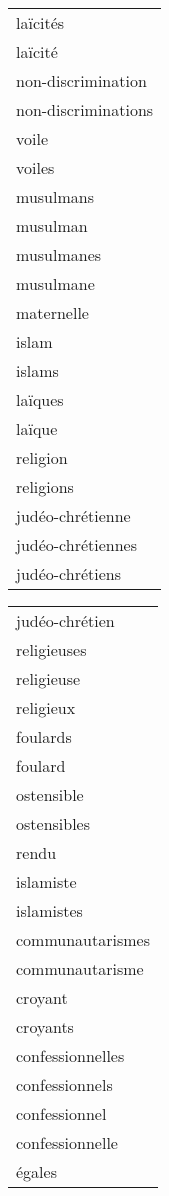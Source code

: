 \begin{table}[h]
\begin{center}
\sffamily
\fontsize{9}{10}
\selectfont{}
\begin{tabular}{|l|}
\hline
laïcités\\
laïcité\\
non-discrimination\\
non-discriminations\\
voile\\
voiles\\
musulmans\\
musulman\\
musulmanes\\
musulmane\\
maternelle\\
islam\\
islams\\
laïques\\
laïque\\
religion\\
religions\\
judéo-chrétienne\\
judéo-chrétiennes\\
judéo-chrétiens\\
\hline
	\end{tabular}
	\begin{tabular}{|l|}
\hline
judéo-chrétien\\
religieuses\\
religieuse\\
religieux\\
foulards\\
foulard\\
ostensible\\
ostensibles\\
rendu\\
islamiste\\
islamistes\\
communautarismes\\
communautarisme\\
croyant\\
croyants\\
confessionnelles\\
confessionnels\\
confessionnel\\
confessionnelle\\
égales\footnotemark[1]\\
\hline
	\end{tabular}
	\begin{tabular}{|l|}

\end{tabular}
\end{center}
\end{table}
